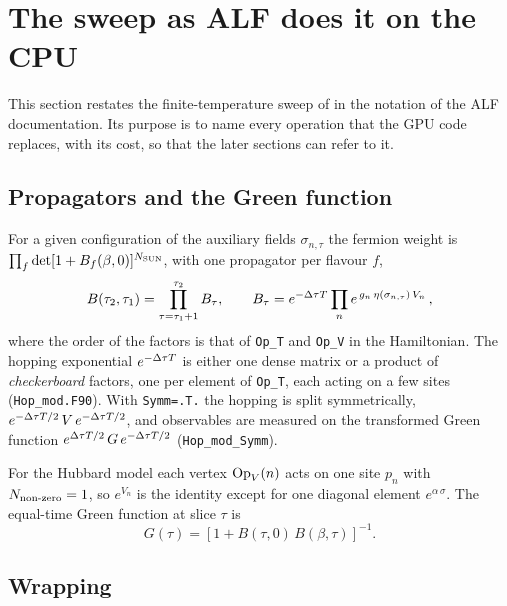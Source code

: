\section{The sweep as ALF does it on the CPU}
\label{sec:cpu}

This section restates the finite-temperature sweep of  in the notation of the ALF documentation. Its purpose is to name every operation that the GPU code replaces, with its cost, so that the later sections can refer to it.

\subsection{Propagators and the Green function}

For a given configuration of the auxiliary fields $\sigma_{n,\tau}$ the fermion weight is $\prod_{f}\det[1+B_f(\beta,0)]^{N_{\rm SUN}}$, with one propagator per flavour $f$,
\begin{equation}
B(\tau_2,\tau_1) = \prod_{\tau=\tau_1+1}^{\tau_2} B_\tau ,\qquad
B_\tau = e^{-\Delta\tau T}\prod_{n} e^{\,g_n\,\eta(\sigma_{n,\tau})\,V_n}\,,
\end{equation}
where the order of the factors is that of \texttt{Op\_T} and \texttt{Op\_V} in the Hamiltonian. The hopping exponential $e^{-\Delta\tau T}$ is either one dense matrix or a product of \emph{checkerboard} factors, one per element of \texttt{Op\_T}, each acting on a few sites (\texttt{Hop\_mod.F90}). With \texttt{Symm=.T.} the hopping is split symmetrically, $e^{-\Delta\tau T/2}\,V\,e^{-\Delta\tau T/2}$, and observables are measured on the transformed Green function $e^{\Delta\tau T/2}\,G\,e^{-\Delta\tau T/2}$ (\texttt{Hop\_mod\_Symm}).

For the Hubbard model each vertex $\mathrm{Op}_V(n)$ acts on one site $p_n$ with $N_{\rm non\text{-}zero}=1$, so $e^{V_n}$ is the identity except for one diagonal element $e^{\alpha\,\sigma}$. The equal-time Green function at slice $\tau$ is
\begin{equation}
G(\tau) = \left[1 + B(\tau,0)\,B(\beta,\tau)\right]^{-1}.
\end{equation}

\subsection{Wrapping}

